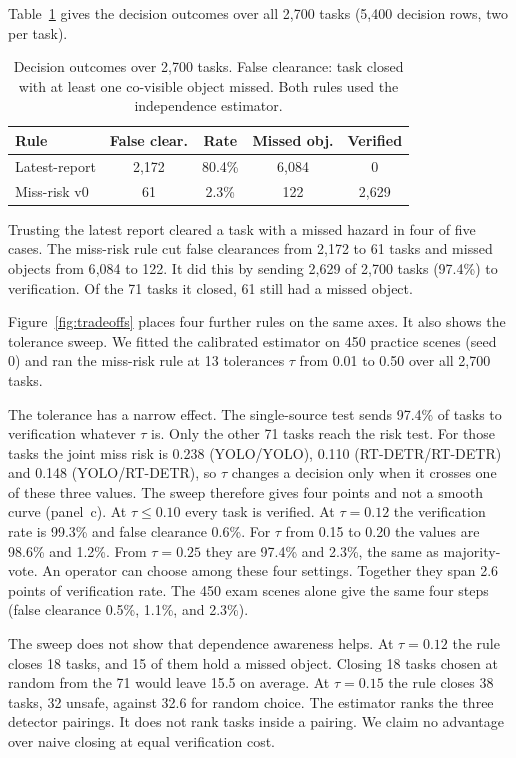 Table~\ref{tab:policy} gives the decision outcomes over all 2{,}700 tasks
(5{,}400 decision rows, two per task).

\begin{table}[t]
\centering
\caption{Decision outcomes over 2{,}700 tasks. False clearance: task closed
with at least one co-visible object missed. Both rules used the independence
estimator.}
\label{tab:policy}
\small
\setlength{\tabcolsep}{3pt}
\begin{tabular}{@{}lcccc@{}}
\toprule
Rule & False clear. & Rate & Missed obj. & Verified \\
\midrule
Latest-report & 2{,}172 & 80.4\% & 6{,}084 & 0 \\
Miss-risk v0  & 61      & 2.3\%  & 122     & 2{,}629 \\
\bottomrule
\end{tabular}
\end{table}

Trusting the latest report cleared a task with a missed hazard in four of
five cases. The miss-risk rule cut false clearances from 2{,}172 to 61 tasks
and missed objects from 6{,}084 to 122. It did this by sending 2{,}629 of
2{,}700 tasks (97.4\%) to verification. Of the 71 tasks it closed, 61 still
had a missed object.

Figure~\ref{fig:tradeoffs} places four further rules on the same axes.
It also shows the tolerance sweep. We fitted the calibrated estimator on 450
practice scenes (seed 0) and ran the miss-risk rule at 13 tolerances $\tau$
from 0.01 to 0.50 over all 2{,}700 tasks.

The tolerance has a narrow effect. The single-source test sends 97.4\% of
tasks to verification whatever $\tau$ is. Only the other 71 tasks reach the
risk test. For those tasks the joint miss risk is 0.238 (YOLO/YOLO), 0.110
(RT-DETR/RT-DETR) and 0.148 (YOLO/RT-DETR), so $\tau$ changes a decision only
when it crosses one of these three values. The sweep therefore gives four
points and not a smooth curve (panel~c). At $\tau\le 0.10$ every task is
verified. At $\tau=0.12$ the verification rate is 99.3\% and false clearance
0.6\%. For $\tau$ from 0.15 to 0.20 the values are 98.6\% and 1.2\%. From
$\tau=0.25$ they are 97.4\% and 2.3\%, the same as majority-vote. An operator
can choose among these four settings. Together they span 2.6 points of
verification rate. The 450 exam scenes alone give the same four steps (false
clearance 0.5\%, 1.1\%, and 2.3\%).

The sweep does not show that dependence awareness helps. At $\tau=0.12$ the
rule closes 18 tasks, and 15 of them hold a missed object. Closing 18 tasks
chosen at random from the 71 would leave 15.5 on average. At $\tau=0.15$ the
rule closes 38 tasks, 32 unsafe, against 32.6 for random choice. The
estimator ranks the three detector pairings. It does not rank tasks inside a
pairing. We claim no advantage over naive closing at equal verification
cost.

